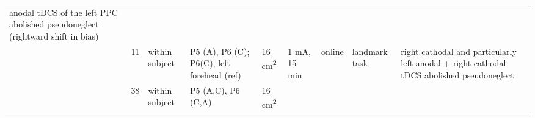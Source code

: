 \documentclass[11pt,]{memoir}
\begin{document}
\begin{longtable}[]{@{}lllllllll@{}}
\begin{minipage}[t]{0.28\columnwidth}
anodal tDCS of the left PPC abolished pseudoneglect
(rightward shift in bias)\strut
\end{minipage}\tabularnewline
\begin{minipage}[t]{0.09\columnwidth}\raggedright
\textcite{Giglia2011}\strut
\end{minipage} & \begin{minipage}[t]{0.02\columnwidth}\raggedright
11\strut
\end{minipage} & \begin{minipage}[t]{0.04\columnwidth}\raggedright
within
subject\strut
\end{minipage} & \begin{minipage}[t]{0.10\columnwidth}\raggedright
P5 (A), P6 (C);
P6(C), left forehead
(ref)\strut
\end{minipage} & \begin{minipage}[t]{0.04\columnwidth}\raggedright
16
cm\textsuperscript{2}\strut
\end{minipage} & \begin{minipage}[t]{0.04\columnwidth}\raggedright
1 mA,
15 min\strut
\end{minipage} & \begin{minipage}[t]{0.04\columnwidth}\raggedright
online\strut
\end{minipage} & \begin{minipage}[t]{0.10\columnwidth}\raggedright
landmark task\strut
\end{minipage} & \begin{minipage}[t]{0.28\columnwidth}\raggedright
right cathodal and particularly left anodal + right cathodal
tDCS abolished pseudoneglect\strut
\end{minipage}\tabularnewline
\begin{minipage}[t]{0.09\columnwidth}\raggedright
\textcite{Benwell2015}\strut
\end{minipage} & \begin{minipage}[t]{0.02\columnwidth}\raggedright
38\strut
\end{minipage} & \begin{minipage}[t]{0.04\columnwidth}\raggedright
within
subject\strut
\end{minipage} & \begin{minipage}[t]{0.10\columnwidth}\raggedright
P5 (A,C), P6 (C,A)\strut
\end{minipage} & \begin{minipage}[t]{0.04\columnwidth}\raggedright
16
cm\textsuperscript{2}\strut
\end{minipage} & \begin{minipage}[t]{0.04\columnwidth}\raggedright

\end{minipage}
\end{longtable}
\end{document}
